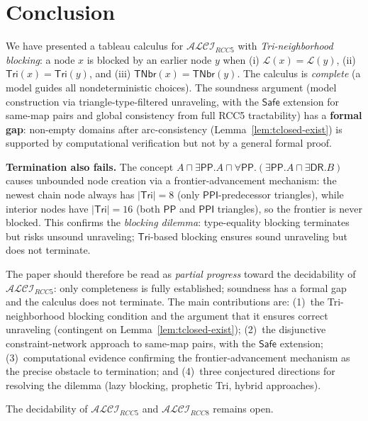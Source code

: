 \documentclass[a4paper,11pt]{article}
\theoremstyle{definition}
\newcommand{\ALCIRCC}[1]{\ensuremath{\mathcal{ALCI}_{\mathit{RCC#1}}}}
\newcommand{\DR}{\ensuremath{\mathsf{DR}}}
\newcommand{\PP}{\ensuremath{\mathsf{PP}}}
\newcommand{\PPI}{\ensuremath{\mathsf{PPI}}}
\newcommand{\Tri}{\ensuremath{\mathsf{Tri}}}
\newcommand{\TNbr}{\ensuremath{\mathsf{TNbr}}}
\newcommand{\Safe}{\ensuremath{\mathsf{Safe}}}
\newcommand{\LL}{\ensuremath{\mathcal{L}}}
\begin{document}
\section{Conclusion}\label{sec:conclusion}

We have presented a tableau calculus for $\ALCIRCC{5}$ with
\emph{Tri-neighborhood blocking}: a node $x$ is blocked by an
earlier node $y$ when (i) $\LL(x) = \LL(y)$, (ii) $\Tri(x) =
\Tri(y)$, and (iii) $\TNbr(x) = \TNbr(y)$.  The calculus is
\emph{complete} (a model guides all nondeterministic choices).
The soundness argument (model construction via
triangle-type-filtered unraveling, with the $\Safe$ extension
for same-map pairs and global consistency from full RCC5
tractability) has a \textbf{formal gap}: non-empty domains after
arc-consistency (Lemma~\ref{lem:tclosed-exist}) is supported by
computational verification but not by a general formal proof.

\textbf{Termination also fails.}  The concept
$A \sqcap \exists\PP.A \sqcap
\forall\PP.(\exists\PP.A \sqcap \exists\DR.B)$
causes unbounded node creation via a frontier-advancement
mechanism: the newest chain node always has $|\Tri| = 8$
(only $\PPI$-predecessor triangles), while interior nodes
have $|\Tri| = 16$ (both $\PP$ and $\PPI$ triangles), so
the frontier is never blocked.  This confirms the
\emph{blocking dilemma}: type-equality blocking terminates
but risks unsound unraveling; $\Tri$-based blocking
ensures sound unraveling but does not terminate.

The paper should therefore be read as \emph{partial progress}
toward the decidability of $\ALCIRCC{5}$: only completeness
is fully established; soundness has a formal gap and the
calculus does not terminate.  The main contributions are:
(1)~the Tri-neighborhood blocking condition and the argument
that it ensures correct unraveling (contingent on
Lemma~\ref{lem:tclosed-exist});
(2)~the disjunctive constraint-network approach to same-map
pairs, with the $\Safe$ extension;
(3)~computational evidence confirming the frontier-advancement
mechanism as the precise obstacle to termination; and
(4)~three conjectured directions for resolving the dilemma
(lazy blocking, prophetic Tri, hybrid approaches).

The decidability of $\ALCIRCC{5}$ and $\ALCIRCC{8}$ remains
open.
\end{document}
